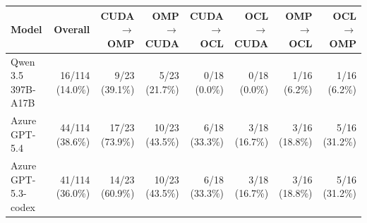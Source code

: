 \begin{tabular}{lrrrrrrr}
\toprule
Model & Overall & CUDA$\to$OMP & OMP$\to$CUDA & CUDA$\to$OCL & OCL$\to$CUDA & OMP$\to$OCL & OCL$\to$OMP \\
\midrule
Qwen 3.5 397B-A17B & 16/114 (14.0\%) & 9/23 (39.1\%) & 5/23 (21.7\%) & 0/18 (0.0\%) & 0/18 (0.0\%) & 1/16 (6.2\%) & 1/16 (6.2\%) \\
Azure GPT-5.4 & 44/114 (38.6\%) & 17/23 (73.9\%) & 10/23 (43.5\%) & 6/18 (33.3\%) & 3/18 (16.7\%) & 3/16 (18.8\%) & 5/16 (31.2\%) \\
Azure GPT-5.3-codex & 41/114 (36.0\%) & 14/23 (60.9\%) & 10/23 (43.5\%) & 6/18 (33.3\%) & 3/18 (16.7\%) & 3/16 (18.8\%) & 5/16 (31.2\%) \\
\bottomrule
\end{tabular}
